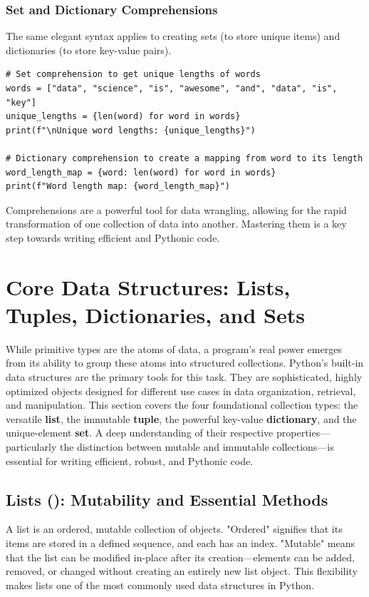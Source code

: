 \subsubsection*{Set and Dictionary Comprehensions}
The same elegant syntax applies to creating sets (to store unique items) and dictionaries (to store key-value pairs).

\text{ }\begin{verbatim}
# Set comprehension to get unique lengths of words
words = ["data", "science", "is", "awesome", "and", "data", "is", "key"]
unique_lengths = {len(word) for word in words}
print(f"\nUnique word lengths: {unique_lengths}")

# Dictionary comprehension to create a mapping from word to its length
word_length_map = {word: len(word) for word in words}
print(f"Word length map: {word_length_map}")
\end{verbatim}
Comprehensions are a powerful tool for data wrangling, allowing for the rapid transformation of one collection of data into another. Mastering them is a key step towards writing efficient and Pythonic code.

\section{Core Data Structures: Lists, Tuples, Dictionaries, and Sets}
\label{sec:core_data_structures}
While primitive types are the atoms of data, a program's real power emerges from its ability to group these atoms into structured collections. Python's built-in data structures are the primary tools for this task. They are sophisticated, highly optimized objects designed for different use cases in data organization, retrieval, and manipulation. This section covers the four foundational collection types: the versatile \textbf{list}, the immutable \textbf{tuple}, the powerful key-value \textbf{dictionary}, and the unique-element \textbf{set}. A deep understanding of their respective properties—particularly the distinction between mutable and immutable collections—is essential for writing efficient, robust, and Pythonic code.

\subsection{Lists (): Mutability and Essential Methods}
\label{subsec:lists}
A list is an ordered, mutable collection of objects. "Ordered" signifies that its items are stored in a defined sequence, and each has an index. "Mutable" means that the list can be modified in-place after its creation—elements can be added, removed, or changed without creating an entirely new list object. This flexibility makes lists one of the most commonly used data structures in Python.

